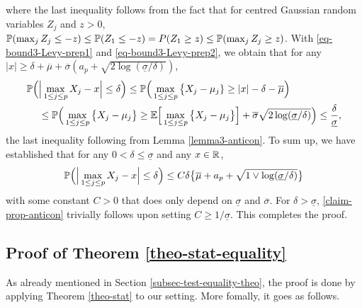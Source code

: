 \documentclass[a4paper,12pt]{article}
\numberwithin{equation}{section}
\begin{document}
where the last inequality follows from the fact that for centred Gaussian random variables $Z_j$ and $z > 0$, $\mathbb{P}(\max_j Z_j \le - z) \le \mathbb{P}(Z_1 \le -z) = P(Z_1 \ge z) \le \mathbb{P}(\max_j Z_j \ge z)$. With \eqref{eq-bound3-Levy-prep1} and \eqref{eq-bound3-Levy-prep2}, we obtain that for any $|x| \ge \delta + \overline{\mu} + \overline{\sigma}(a_p + \sqrt{2\log(\underline{\sigma}/\delta)})$,
\begin{align*} 
\mathbb{P} \Big( & \Big| \max_{1 \le j \le p} X_j - x \Big| \le \delta \Big) \le \mathbb{P} \Big( \max_{1 \le j \le p} \big\{ X_j - \mu_j \} \ge |x| - \delta - \overline{\mu} \Big) \\
 & \le \mathbb{P} \Big( \max_{1 \le j \le p} \big\{ X_j - \mu_j \big\} \ge \mathbb{E} \Big[ \max_{1 \le j \le p} \big\{ X_j-\mu_j \big\} \Big] + \overline{\sigma} \sqrt{2\log(\underline{\sigma}/\delta)} \Big) \le \frac{\delta}{\underline{\sigma}}, 
\end{align*}
the last inequality following from Lemma \ref{lemma3-anticon}. To sum up, we have established that for any $0 < \delta \le \underline{\sigma}$ and any $x \in \mathbb{R}$, 
\begin{equation}\label{claim-prop-anticon}
\mathbb{P} \Big( \Big| \max_{1 \le j \le p} X_j - x \Big| \le \delta \Big) \le C \delta \big\{ \overline{\mu} + a_p + \sqrt{1 \vee \log(\underline{\sigma}/\delta)} \big\} 
\end{equation}
with some constant $C > 0$ that does only depend on $\underline{\sigma}$ and $\overline{\sigma}$. For $\delta > \underline{\sigma}$, \eqref{claim-prop-anticon} trivially follows upon setting $C \ge 1/\underline{\sigma}$. This completes the proof. 





\subsection*{Proof of Theorem \ref{theo-stat-equality}}

As already mentioned in Section \ref{subsec-test-equality-theo}, the proof is done by applying Theorem \ref{theo-stat} to our setting. More fomally, it goes as follows.
\end{document}
